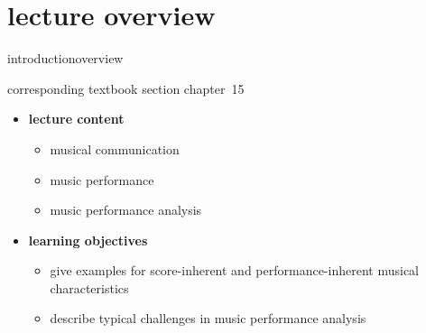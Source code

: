 


\subtitle{Module 15: Music Performance Analysis}


	

    \section[overview]{lecture overview}
        \begin{frame}{introduction}{overview}
            \begin{block}{corresponding textbook section}
                    chapter~15
            \end{block}

            \begin{itemize}
                \item   \textbf{lecture content}
                    \begin{itemize}
                        \item   musical communication
                        \item   music performance
                        \item   music performance analysis
                    \end{itemize}
                \bigskip
                \item<2->   \textbf{learning objectives}
                    \begin{itemize}
                        \item   give examples for score-inherent and performance-inherent musical characteristics
                        \item   describe typical challenges in music performance analysis
                    \end{itemize}
            \end{itemize}
        \end{frame}

